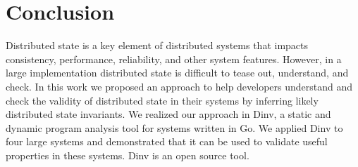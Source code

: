 \section{Conclusion}
\label{sec:conclusion}

Distributed state is a key element of distributed systems that impacts
consistency, performance, reliability, and other system
features. However, in a large implementation distributed state is
difficult to tease out, understand, and check. In this work we
proposed an approach to help developers understand and check the
validity of distributed state in their systems by inferring likely
distributed state invariants. We realized our approach in Dinv, a
static and dynamic program analysis tool for systems written in Go. We
applied Dinv to four large systems and demonstrated that it can be
used to validate useful properties in these systems. Dinv is an open
source tool.
